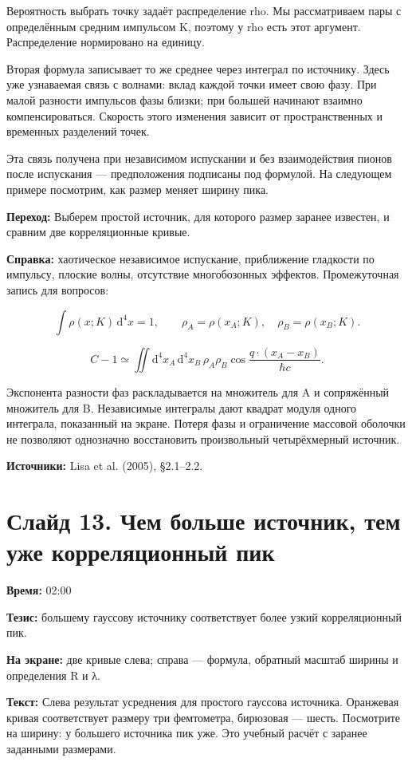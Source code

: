 \documentclass[11pt,a4paper]{article}
\newcommand{\hc}{\hbar c}
\newcommand{\dd}{\mathrm d}
\begin{document}
Вероятность выбрать точку задаёт распределение rho. Мы рассматриваем пары с определённым средним импульсом K, поэтому у rho есть этот аргумент. Распределение нормировано на единицу.

Вторая формула записывает то же среднее через интеграл по источнику. Здесь уже узнаваемая связь с волнами: вклад каждой точки имеет свою фазу. При малой разности импульсов фазы близки; при большей начинают взаимно компенсироваться. Скорость этого изменения зависит от пространственных и временных разделений точек.

Эта связь получена при независимом испускании и без взаимодействия пионов после испускания — предположения подписаны под формулой. На следующем примере посмотрим, как размер меняет ширину пика.

\textbf{Переход:} Выберем простой источник, для которого размер заранее известен, и сравним две корреляционные кривые.

\textbf{Справка:} хаотическое независимое испускание, приближение гладкости по импульсу, плоские волны, отсутствие многобозонных эффектов. Промежуточная запись для вопросов:

\[\int\rho(x;K)\,\dd^4x=1,\qquad\rho_A=\rho(x_A;K),\quad\rho_B=\rho(x_B;K).\]

\[C-1\simeq\iint\dd^4x_A\,\dd^4x_B\,\rho_A\rho_B\cos\!\frac{q\cdot(x_A-x_B)}{\hc}.\]

Экспонента разности фаз раскладывается на множитель для A и сопряжённый множитель для B. Независимые интегралы дают квадрат модуля одного интеграла, показанный на экране. Потеря фазы и ограничение массовой оболочки не позволяют однозначно восстановить произвольный четырёхмерный источник.

\textbf{Источники:} Lisa et al. (2005), §2.1–2.2.

\clearpage
\section*{Слайд 13. Чем больше источник, тем уже корреляционный пик}
\textbf{Время:} 02:00

\textbf{Тезис:} большему гауссову источнику соответствует более узкий корреляционный пик.

\textbf{На экране:} две кривые слева; справа — формула, обратный масштаб ширины и определения R и λ.

\textbf{Текст:} Слева результат усреднения для простого гауссова источника. Оранжевая кривая соответствует размеру три фемтометра, бирюзовая — шесть. Посмотрите на ширину: у большего источника пик уже. Это учебный расчёт с заранее заданными размерами.
\end{document}
